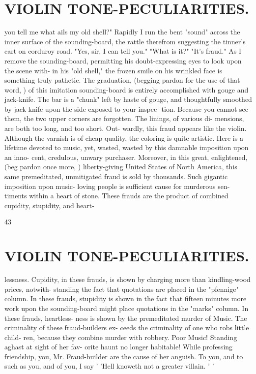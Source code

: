 \documentclass{article}
\begin{document}
\section*{VIOLIN TONE-PECULIARITIES.}
you tell me what ails my old shell?" Rapidly I run the bent "sound" across the inner surface of the sounding-board, the rattle therefrom suggesting the tinner's cart on corduroy road. "Yes, sir, I can tell you." "What is it?" "It's fraud." As I remove the sounding-board, permitting his doubt-expressing eyes to look upon the scene with- in his "old shell," the frozen smile on his wrinkled face is something truly pathetic. The graduation, (begging pardon for the use of that word, ) of this imitation sounding-board is entirely accomplished with gouge and jack-knife. The bar is a "chunk" left by haste of gouge, and thoughtfully smoothed by jack-knife upon the side exposed to your inspec- tion. Because you cannot see them, the two upper corners are forgotten. The linings, of various di- mensions, are both too long, and too short. Out- wardly, this fraud appears like the violin. Although the varnish is of cheap quality, the coloring is quite artistic. Here is a lifetime devoted to music, yet, wasted, wasted by this damnable imposition upon an inno- cent, credulous, unwary purchaser. Moreover, in this great, enlightened, (beg pardon once more, ) liberty-giving United States of North America, this same premeditated, unmitigated fraud is sold by thousands. Such gigantic imposition upon music- loving people is sufficient cause for murderous sen- timents within a heart of stone. These frauds are the product of combined cupidity, stupidity, and heart-

43

\section*{VIOLIN TONE-PECULIARITIES.}
lessness. Cupidity, in these frauds, is shown by charging more than kindling-wood prices, notwith- standing the fact that quotations are placed in the "pfennige" column. In these frauds, stupidity is shown in the fact that fifteen minutes more work upon the sounding-board might place quotations in the "marks" column. In these frauds, heartless- ness is shown by the premeditated murder of Music. The criminality of these fraud-builders ex- ceeds the criminality of one who robs little child- ren, because they combine murder with robbery. Poor Music! Standing aghast at sight of her fav- orite haunt no longer habitable! While professing friendship, you, Mr. Fraud-builder are the cause of her anguish. To you, and to such as you, and of you, I say ' 'Hell knoweth not a greater villain. ' '
\end{document}
